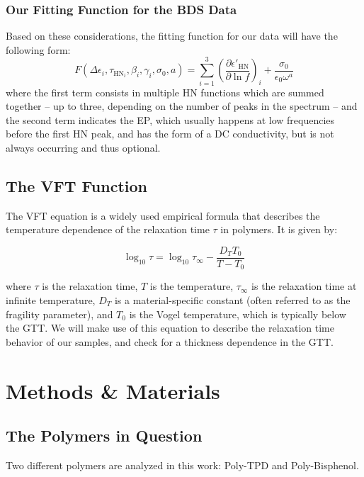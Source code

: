 \subsection{Our Fitting Function for the BDS Data}
Based on these considerations, the fitting function for our data will have the following form: \begin{equation}
F(\Delta\epsilon_i, \tau_{\text{HN}_i}, \beta_i, \gamma_i, \sigma_0, a) = \sum_{i=1}^{3} \left(\frac{\partial \epsilon'_{\text{HN}}}{\partial \ln f}\right)_i + \frac{\sigma_0}{\epsilon_0 \omega^a}
\label{eq:der_eps}
\end{equation}
where the first term consists in multiple \ac{HN} functions which are summed together -- up to three, depending on the number of peaks in the spectrum -- and the second term indicates the \ac{EP}, which usually happens at low frequencies before the first \ac{HN} peak, and has the form of a DC conductivity, but is not always occurring and thus optional.

\section{The VFT Function}

The \ac{VFT} equation is a widely used empirical formula that describes the temperature dependence of the relaxation time $\tau$ in polymers. It is given by:

\[
\log_{10} \tau = \log_{10} \tau_\infty - \frac{D_T T_0}{T - T_0}
\]

where $\tau$ is the relaxation time, $T$ is the temperature, $\tau_\infty$ is the relaxation time at infinite temperature, $D_T$ is a material-specific constant (often referred to as the fragility parameter), and $T_0$ is the Vogel temperature, which is typically below the \ac{GTT}.
We will make use of this equation to describe the relaxation time behavior of our samples, and check for a thickness dependence in the \ac{GTT}.
\chapter{Methods \& Materials}
\section{The Polymers in Question}
Two different polymers are analyzed in this work: \ac{Poly-TPD} and \ac{Poly-Bisphenol}.
